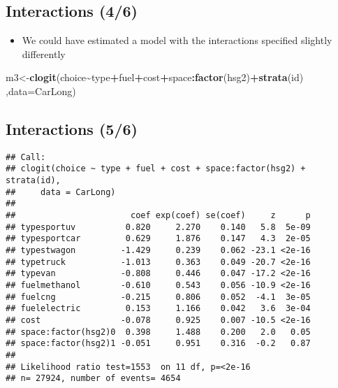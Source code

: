 \documentclass[
  11pt,
]{article}
\newenvironment{Shaded}{\begin{snugshade}}{\end{snugshade}}
\newcommand{\AttributeTok}[1]{\textcolor[rgb]{0.13,0.29,0.53}{#1}}
\newcommand{\FunctionTok}[1]{\textcolor[rgb]{0.13,0.29,0.53}{\textbf{#1}}}
\newcommand{\NormalTok}[1]{#1}
\newcommand{\OtherTok}[1]{\textcolor[rgb]{0.56,0.35,0.01}{#1}}
\newcommand{\SpecialCharTok}[1]{\textcolor[rgb]{0.81,0.36,0.00}{\textbf{#1}}}
\providecommand{\tightlist}{%
  \setlength{\itemsep}{0pt}\setlength{\parskip}{0pt}}
\begin{document}
\hypertarget{interactions-46}{%
\subsection{Interactions (4/6)}\label{interactions-46}}

\begin{itemize}
\tightlist
\item
  We could have estimated a model with the interactions specified
  slightly differently
\end{itemize}

\footnotesize

\begin{Shaded}
\begin{Highlighting}[]
\NormalTok{m3}\OtherTok{\textless{}{-}}\FunctionTok{clogit}\NormalTok{(choice}\SpecialCharTok{\textasciitilde{}}\NormalTok{type}\SpecialCharTok{+}\NormalTok{fuel}\SpecialCharTok{+}\NormalTok{cost}\SpecialCharTok{+}\NormalTok{space}\SpecialCharTok{:}\FunctionTok{factor}\NormalTok{(hsg2)}\SpecialCharTok{+}\FunctionTok{strata}\NormalTok{(id)}
\NormalTok{           ,}\AttributeTok{data=}\NormalTok{CarLong)}
\end{Highlighting}
\end{Shaded}

\normalsize

\hypertarget{interactions-56}{%
\subsection{Interactions (5/6)}\label{interactions-56}}

\footnotesize

\begin{verbatim}
## Call:
## clogit(choice ~ type + fuel + cost + space:factor(hsg2) + strata(id), 
##     data = CarLong)
## 
##                       coef exp(coef) se(coef)     z      p
## typesportuv          0.820     2.270    0.140   5.8  5e-09
## typesportcar         0.629     1.876    0.147   4.3  2e-05
## typestwagon         -1.429     0.239    0.062 -23.1 <2e-16
## typetruck           -1.013     0.363    0.049 -20.7 <2e-16
## typevan             -0.808     0.446    0.047 -17.2 <2e-16
## fuelmethanol        -0.610     0.543    0.056 -10.9 <2e-16
## fuelcng             -0.215     0.806    0.052  -4.1  3e-05
## fuelelectric         0.153     1.166    0.042   3.6  3e-04
## cost                -0.078     0.925    0.007 -10.5 <2e-16
## space:factor(hsg2)0  0.398     1.488    0.200   2.0   0.05
## space:factor(hsg2)1 -0.051     0.951    0.316  -0.2   0.87
## 
## Likelihood ratio test=1553  on 11 df, p=<2e-16
## n= 27924, number of events= 4654
\end{verbatim}
\end{document}
